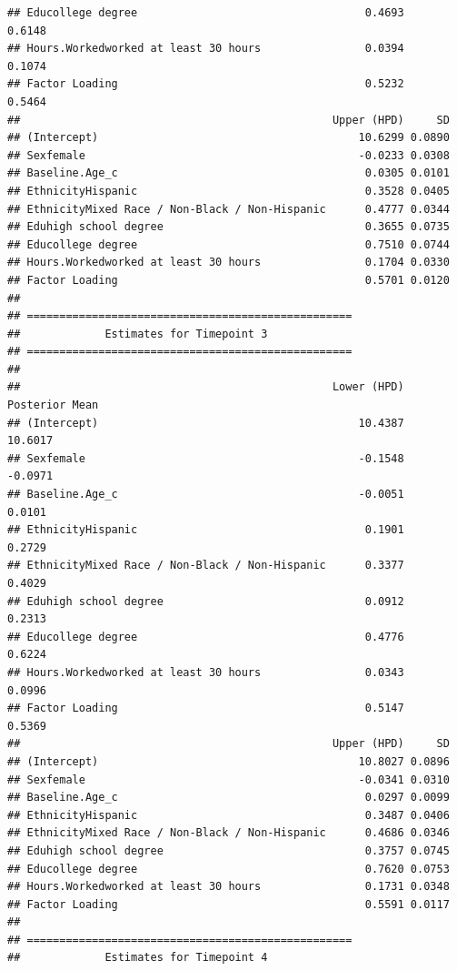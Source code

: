 \documentclass[a4paper, preprint, 3p,
authoryear]{elsarticle} %
\begin{document}
\begin{verbatim}
## Educollege degree                                   0.4693         0.6148
## Hours.Workedworked at least 30 hours                0.0394         0.1074
## Factor Loading                                      0.5232         0.5464
##                                                Upper (HPD)     SD
## (Intercept)                                        10.6299 0.0890
## Sexfemale                                          -0.0233 0.0308
## Baseline.Age_c                                      0.0305 0.0101
## EthnicityHispanic                                   0.3528 0.0405
## EthnicityMixed Race / Non-Black / Non-Hispanic      0.4777 0.0344
## Eduhigh school degree                               0.3655 0.0735
## Educollege degree                                   0.7510 0.0744
## Hours.Workedworked at least 30 hours                0.1704 0.0330
## Factor Loading                                      0.5701 0.0120
## 
## ==================================================
##             Estimates for Timepoint 3
## ==================================================
## 
##                                                Lower (HPD) Posterior Mean
## (Intercept)                                        10.4387        10.6017
## Sexfemale                                          -0.1548        -0.0971
## Baseline.Age_c                                     -0.0051         0.0101
## EthnicityHispanic                                   0.1901         0.2729
## EthnicityMixed Race / Non-Black / Non-Hispanic      0.3377         0.4029
## Eduhigh school degree                               0.0912         0.2313
## Educollege degree                                   0.4776         0.6224
## Hours.Workedworked at least 30 hours                0.0343         0.0996
## Factor Loading                                      0.5147         0.5369
##                                                Upper (HPD)     SD
## (Intercept)                                        10.8027 0.0896
## Sexfemale                                          -0.0341 0.0310
## Baseline.Age_c                                      0.0297 0.0099
## EthnicityHispanic                                   0.3487 0.0406
## EthnicityMixed Race / Non-Black / Non-Hispanic      0.4686 0.0346
## Eduhigh school degree                               0.3757 0.0745
## Educollege degree                                   0.7620 0.0753
## Hours.Workedworked at least 30 hours                0.1731 0.0348
## Factor Loading                                      0.5591 0.0117
## 
## ==================================================
##             Estimates for Timepoint 4

\end{verbatim}
\end{document}
